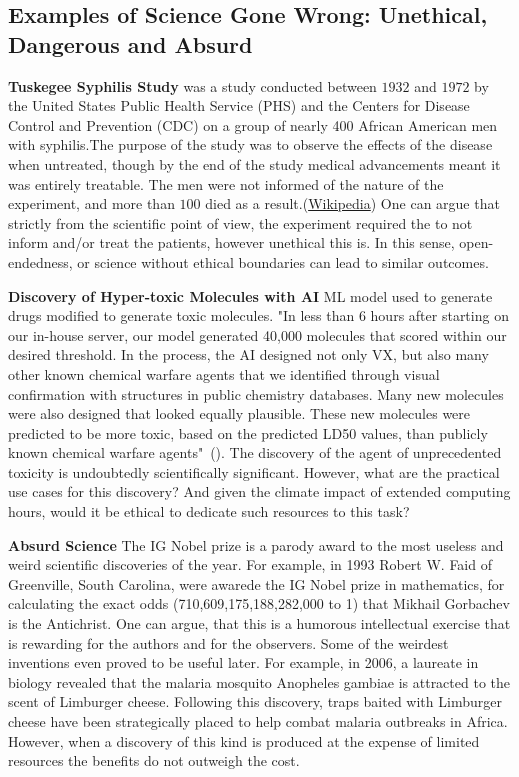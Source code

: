 \documentclass{article}
\begin{document}
\subsection{Examples of Science Gone Wrong: Unethical, Dangerous and Absurd}
\textbf{Tuskegee Syphilis Study} was a study conducted between $1932$ and $1972$ by the United States Public Health Service (PHS) and the Centers for Disease Control and Prevention (CDC) on a group of nearly 400 African American men with syphilis.The purpose of the study was to observe the effects of the disease when untreated, though by the end of the study medical advancements meant it was entirely treatable. The men were not informed of the nature of the experiment, and more than $100$ died as a result.(\href{$https://en.wikipedia.org/wiki/Tuskegee_Syphilis_Study$}{Wikipedia}) One can argue that strictly from the scientific point of view, the experiment required the to not inform and/or treat the patients, however unethical this is. In this sense, open-endedness, or science without ethical boundaries can lead to similar outcomes.

\textbf{Discovery of Hyper-toxic Molecules with AI}
ML model used to generate drugs modified to generate toxic molecules. "In less than 6 hours after starting on our
in-house server, our model generated 40,000
molecules that scored within our desired
threshold. In the process, the AI designed
not only VX, but also many other known
chemical warfare agents that we identified
through visual confirmation with structures
in public chemistry databases. Many new
molecules were also designed that looked
equally plausible. These new molecules
were predicted to be more toxic, based on
the predicted LD50 values, than publicly
known chemical warfare agents"~(\cite{urbina2022dual}). The discovery of the agent of unprecedented toxicity is undoubtedly scientifically significant. However, what are the practical use cases for this discovery? And given the climate impact of extended computing hours, would it be ethical to dedicate such resources to this task?

\textbf{Absurd Science} The IG Nobel prize is a parody award to the most useless and weird scientific discoveries of the year. For example, in 1993  Robert W. Faid of Greenville, South Carolina, were awarede the IG Nobel prize in mathematics, for calculating the exact odds (710,609,175,188,282,000 to 1) that Mikhail Gorbachev is the Antichrist. One can argue, that this is a humorous intellectual exercise that is rewarding for the authors and for the observers. Some of the weirdest inventions even proved to be useful later. For example, in 2006, a laureate in biology revealed that the malaria mosquito Anopheles gambiae is attracted to the scent of Limburger cheese. Following this discovery, traps baited with Limburger cheese have been strategically placed to help combat malaria outbreaks in Africa. However, when a discovery of this kind is produced at the expense of limited resources the benefits do not outweigh the cost.
\end{document}
